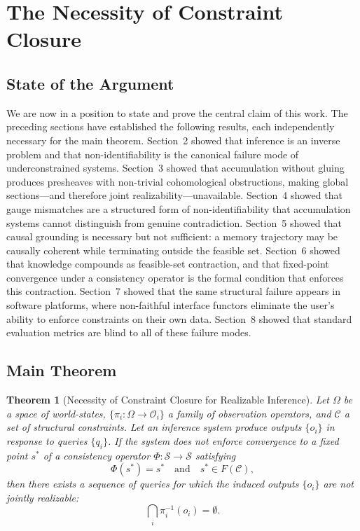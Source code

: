 \documentclass[12pt, oneside]{article}
\newtheorem{theorem}{Theorem}
\begin{document}
\section{The Necessity of Constraint Closure}

\subsection{State of the Argument}

We are now in a position to state and prove the central claim of this work. The preceding sections have established the following results, each independently necessary for the main theorem. Section~2 showed that inference is an inverse problem and that non-identifiability is the canonical failure mode of underconstrained systems. Section~3 showed that accumulation without gluing produces presheaves with non-trivial cohomological obstructions, making global sections---and therefore joint realizability---unavailable. Section~4 showed that gauge mismatches are a structured form of non-identifiability that accumulation systems cannot distinguish from genuine contradiction. Section~5 showed that causal grounding is necessary but not sufficient: a memory trajectory may be causally coherent while terminating outside the feasible set. Section~6 showed that knowledge compounds as feasible-set contraction, and that fixed-point convergence under a consistency operator is the formal condition that enforces this contraction. Section~7 showed that the same structural failure appears in software platforms, where non-faithful interface functors eliminate the user's ability to enforce constraints on their own data. Section~8 showed that standard evaluation metrics are blind to all of these failure modes.

\subsection{Main Theorem}

\begin{theorem}[Necessity of Constraint Closure for Realizable Inference]
Let $\Omega$ be a space of world-states, $\{\pi_i : \Omega \to \mathcal{O}_i\}$ a family of observation operators, and $\mathcal{C}$ a set of structural constraints. Let an inference system produce outputs $\{o_i\}$ in response to queries $\{q_i\}$. If the system does not enforce convergence to a fixed point $s^*$ of a consistency operator $\Phi : \mathcal{S} \to \mathcal{S}$ satisfying
\begin{equation}
  \Phi(s^*) = s^* \quad \text{and} \quad s^* \in F(\mathcal{C}),
\end{equation}
then there exists a sequence of queries for which the induced outputs $\{o_i\}$ are not jointly realizable:
\begin{equation}
  \bigcap_i \pi_i^{-1}(o_i) = \emptyset.
\end{equation}
\end{theorem}
\end{document}

